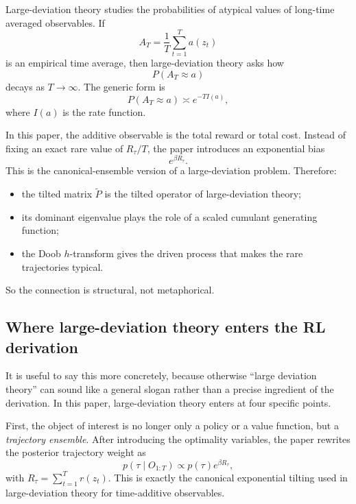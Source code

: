 \documentclass[11pt]{article}
\begin{document}
Large-deviation theory studies the probabilities of atypical values of long-time averaged
observables. If
\[
    A_T=\frac{1}{T}\sum_{t=1}^T a(z_t)
\]
is an empirical time average, then large-deviation theory asks how
\[
    P(A_T\approx a)
\]
decays as \(T\to\infty\). The generic form is
\begin{equation}
    P(A_T\approx a)\asymp e^{-T I(a)},
\end{equation}
where \(I(a)\) is the rate function.

In this paper, the additive observable is the total reward or total cost. Instead of fixing
an exact rare value of \(R_\tau/T\), the paper introduces an exponential bias
\[
e^{\beta R_\tau}.
\]
This is the canonical-ensemble version of a large-deviation problem. Therefore:
\begin{itemize}
    \item the tilted matrix \(\widetilde{P}\) is the tilted operator of large-deviation theory;
    \item its dominant eigenvalue plays the role of a scaled cumulant generating function;
    \item the Doob \(h\)-transform gives the driven process that makes the rare trajectories
    typical.
\end{itemize}

So the connection is structural, not metaphorical.

\subsection*{Where large-deviation theory enters the RL derivation}

It is useful to say this more concretely, because otherwise ``large deviation theory'' can
sound like a general slogan rather than a precise ingredient of the derivation. In this paper,
large-deviation theory enters at four specific points.

First, the object of interest is no longer only a policy or a value function, but a
\emph{trajectory ensemble}. After introducing the optimality variables, the paper rewrites the
posterior trajectory weight as
\begin{equation}
    p(\tau\mid O_{1:T})
    \propto
    p(\tau)e^{\beta R_\tau},
\end{equation}
with \(R_\tau=\sum_{t=1}^T r(z_t)\). This is exactly the canonical exponential tilting used in
large-deviation theory for time-additive observables.
\end{document}
